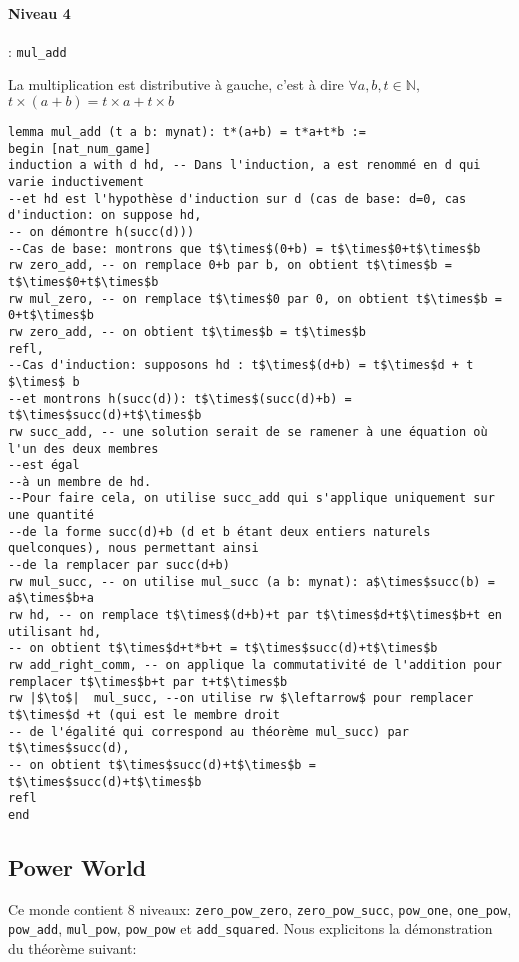 \paragraph{Niveau 4} :  \texttt{mul\_add}  \begin{center} La multiplication est distributive à gauche, c'est à dire  $\forall a, b, t \in \mathbb{N},$  $t\times(a+b)=t\times a+t\times b $ \end{center}
\begin{verbatim}
lemma mul_add (t a b: mynat): t*(a+b) = t*a+t*b :=
begin [nat_num_game]
induction a with d hd, -- Dans l'induction, a est renommé en d qui varie inductivement 
--et hd est l'hypothèse d'induction sur d (cas de base: d=0, cas d'induction: on suppose hd, 
-- on démontre h(succ(d)))   
--Cas de base: montrons que t$\times$(0+b) = t$\times$0+t$\times$b
rw zero_add, -- on remplace 0+b par b, on obtient t$\times$b = t$\times$0+t$\times$b 
rw mul_zero, -- on remplace t$\times$0 par 0, on obtient t$\times$b = 0+t$\times$b 
rw zero_add, -- on obtient t$\times$b = t$\times$b
refl,
--Cas d'induction: supposons hd : t$\times$(d+b) = t$\times$d + t $\times$ b
--et montrons h(succ(d)): t$\times$(succ(d)+b) = t$\times$succ(d)+t$\times$b 
rw succ_add, -- une solution serait de se ramener à une équation où l'un des deux membres 
--est égal 
--à un membre de hd. 
--Pour faire cela, on utilise succ_add qui s'applique uniquement sur une quantité 
--de la forme succ(d)+b (d et b étant deux entiers naturels quelconques), nous permettant ainsi 
--de la remplacer par succ(d+b)
rw mul_succ, -- on utilise mul_succ (a b: mynat): a$\times$succ(b) = a$\times$b+a
rw hd, -- on remplace t$\times$(d+b)+t par t$\times$d+t$\times$b+t en utilisant hd, 
-- on obtient t$\times$d+t*b+t = t$\times$succ(d)+t$\times$b
rw add_right_comm, -- on applique la commutativité de l'addition pour remplacer t$\times$b+t par t+t$\times$b
rw |$\to$|  mul_succ, --on utilise rw $\leftarrow$ pour remplacer t$\times$d +t (qui est le membre droit
-- de l'égalité qui correspond au théorème mul_succ) par t$\times$succ(d), 
-- on obtient t$\times$succ(d)+t$\times$b = t$\times$succ(d)+t$\times$b
refl
end
\end{verbatim}
\subsection{Power World}
Ce monde contient 8 niveaux: \texttt{zero\_pow\_zero}, \texttt{zero\_pow\_succ}, \texttt{pow\_one}, \texttt{one\_pow}, \texttt{pow\_add}, \texttt{mul\_pow}, \texttt{pow\_pow} et \texttt{add\_squared}.
Nous explicitons la démonstration du théorème suivant:\\
